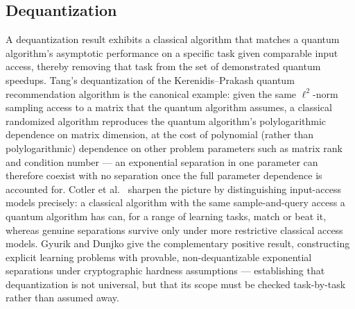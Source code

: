 \documentclass[11pt]{article}
\begin{document}
\subsection{Dequantization}
A dequantization result exhibits a classical algorithm that matches a quantum algorithm's asymptotic performance on a specific task given comparable input access, thereby removing that task from the set of demonstrated quantum speedups. Tang's dequantization of the Kerenidis--Prakash quantum recommendation algorithm \cite{Tang2019} is the canonical example: given the same $\ell^2$-norm sampling access to a matrix that the quantum algorithm assumes, a classical randomized algorithm reproduces the quantum algorithm's polylogarithmic dependence on matrix dimension, at the cost of polynomial (rather than polylogarithmic) dependence on other problem parameters such as matrix rank and condition number — an exponential separation in one parameter can therefore coexist with no separation once the full parameter dependence is accounted for. Cotler et al.\ \cite{Cotler2021} sharpen the picture by distinguishing input-access models precisely: a classical algorithm with the same sample-and-query access a quantum algorithm has can, for a range of learning tasks, match or beat it, whereas genuine separations survive only under more restrictive classical access models. Gyurik and Dunjko \cite{Gyurik2023} give the complementary positive result, constructing explicit learning problems with provable, non-dequantizable exponential separations under cryptographic hardness assumptions — establishing that dequantization is not universal, but that its scope must be checked task-by-task rather than assumed away.
\end{document}
